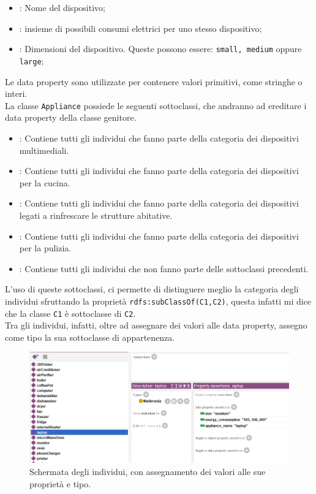 \documentclass[12pt, letterpaper]{article}
\begin{document}
\begin{itemize}
      \item {}: Nome del dispositivo;
      \item {}: insieme di possibili consumi elettrici per uno stesso
            dispositivo;
      \item {}: Dimensioni del dispositivo. Queste possono
            essere: \texttt{small, medium} oppure \texttt{large};
\end{itemize}

\noindent Le data property sono utilizzate per contenere valori primitivi, come stringhe o interi. \\

\noindent La classe \texttt{Appliance} possiede le seguenti sottoclassi, che andranno ad ereditare i
data property della classe genitore.

\begin{itemize}
      \item {}: Contiene tutti gli individui che fanno parte della categoria dei dispositivi multimediali.
      \item {}: Contiene tutti gli individui che fanno parte della categoria dei dispositivi per la cucina.
      \item {}: Contiene tutti gli individui che fanno parte della categoria dei dispositivi legati a rinfrescare
            le strutture abitative.
      \item {}: Contiene tutti gli individui che fanno parte della categoria dei dispositivi per la pulizia.
      \item {}: Contiene tutti gli individui che non fanno parte delle sottoclassi precedenti.
\end{itemize}

\noindent L'uso di queste sottoclassi, ci permette di distinguere meglio la categoria degli individui sfruttando
la proprietà \texttt{rdfs:subClassOf(C1,C2)}, questa infatti mi dice che la
classe \texttt{C1} è sottoclasse di \texttt{C2}. \\

\noindent Tra gli individui, infatti, oltre ad assegnare dei valori alle data property, assegno come tipo la sua
sottoclasse di appartenenza.

\begin{figure}[h]
      \centering
      \includegraphics[scale=0.6]{individui-protege.png}
      \caption{Schermata degli individui, con assegnamento dei valori alle sue proprietà e tipo.}
\end{figure}
\end{document}
